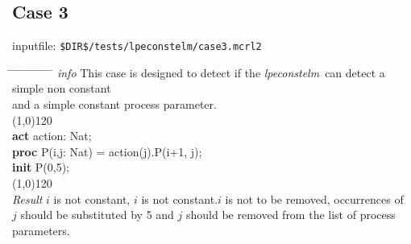 \index{}\documentclass[a4paper,10pt]{article}
\theoremstyle{plain}
\theoremstyle{definition}
\newcommand{\tool}{\textit{lpeconstelm}}
\newcommand{\pp}{process parameter}
\newcommand{\pps}{process parameters}
\newcommand{\ti}{\textit}
\newcommand{\tb}{\textbf}
\newcommand{\tabw}{\hspace*{15.mm} \= \hspace*{20.mm} \= \hspace*{5.mm} \= \hspace*{5.mm} \= \hspace*{5.mm} \= \hspace*{5.mm}  \= \hspace*{5.mm}  \= \hspace*{5.mm}  \= \hspace*{5.mm} \= \hspace*{5.mm} \= \hspace*{5.mm}  \= \hspace*{5.mm}  \= \hspace*{5.mm}\kill}
\begin{document}
\subsection*{Case 3}
inputfile: \verb"$DIR$/tests/lpeconstelm/case3.mcrl2"
\begin{tabbing}
\tabw
\ti{info} 
\> This case is designed to detect if the \tool\ can detect a simple non constant \\
\> and a simple constant \pp .\\
\line(1,0){120}\\
\tb{act}  \> action: Nat;\\
\tb{proc} \> P(i,j: Nat) \> = \> action(j).P(i+1, j);\\
\tb{init} \> P(0,5);\\
\line(1,0){120}\\
\ti{Result} \> $i$ is not constant, $i$ is not constant.$i$ is not to be removed, occurrences of \\
\> $j$ should be substituted by 5 and $j$ should be removed from the list of \pps .\\ 
\end{tabbing}
\end{document}

